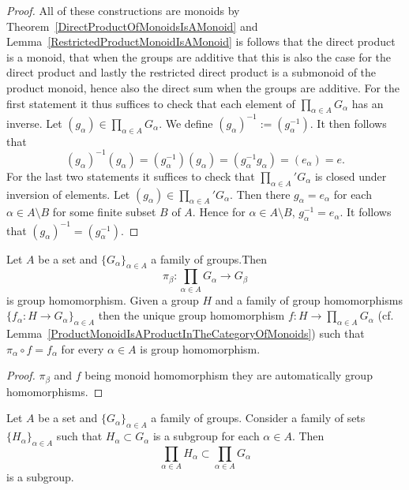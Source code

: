 \begin{proof}
    All of these constructions are monoids by Theorem~\ref{DirectProductOfMonoidsIsAMonoid} and Lemma~\ref{RestrictedProductMonoidIsAMonoid} is follows that the direct product is a monoid, that when the groups are additive that this is also the case for the direct product and lastly the restricted direct product is a submonoid of the product monoid, hence also the direct sum when the groups are additive. For the first statement it thus suffices to check that each element of $\prod_{\alpha\in A} G_\alpha$ has an inverse. Let $(g_\alpha)\in \prod_{\alpha\in A} G_\alpha$. We define $(g_\alpha)^{-1}:= (g_\alpha^{-1})$. It then follows that 
    $$(g_\alpha)^{-1}(g_\alpha) = (g_\alpha^{-1})(g_\alpha) = (g_\alpha^{-1}g_\alpha) = (e_\alpha)= e.$$
    For the last two statements it suffices to check that $\prod_{\alpha \in A}' G_\alpha$ is closed under inversion of elements. Let $(g_\alpha ) \in \prod_{\alpha \in A}' G_\alpha.$  Then there $g_\alpha = e_\alpha$ for each $\alpha \in A\setminus B$ for some finite subset $B$ of $A$. Hence for $\alpha \in A\setminus B$, $g_\alpha^{-1} = e_\alpha$. It follows that $(g_\alpha)^{-1} =\left(g_\alpha^{-1}\right)$.
\end{proof}
\begin{proposition}\label{ProductGroupIsProductInCategoryOfGroups}
    Let $A$ be a set and $\{G_\alpha\}_{\alpha \in A}$ a family of groups.Then 
    $$\pi_\beta : \prod_{\alpha\in A} G_\alpha \rightarrow G_\beta$$
    is group homomorphism. Given a group $H$ and a family of group homomorphisms $\{f_\alpha : H\rightarrow G_\alpha\}_{\alpha\in A}$ then the unique group homomorphism $f: H\rightarrow \prod_{\alpha\in A} G_\alpha$ (cf. Lemma~\ref{ProductMonoidIsAProductInTheCategoryOfMonoids}) such that $\pi_\alpha \circ f = f_\alpha$ for every $\alpha \in A$ is group homomorphism. 
\end{proposition}
\begin{proof}
    $\pi_\beta$ and $f$ being monoid homomorphism they are automatically group homomorphisms.
\end{proof}
\begin{proposition}\label{CertainSubgroupsOfProductGroup}
    Let $A$ be a set and $\{G_\alpha\}_{\alpha\in A}$ a family of groups. Consider a family of sets $\{H_\alpha\}_{\alpha\in A}$ such that $H_\alpha\subset G_\alpha$ is a subgroup for each $\alpha\in A$. Then $$\prod_{\alpha\in A} H_\alpha \subset \prod_{\alpha \in A} G_\alpha$$
    is a subgroup.
\end{proposition}
